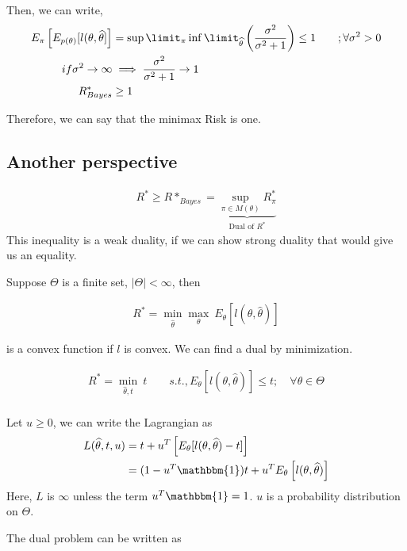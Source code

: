 \documentclass[10pt]{article}
\renewcommand{\hat}{\widehat}
\begin{document}
	Then, we can write,
	\begin{align*}
		E_{\pi}\left[ E_{p(\theta)} [l(\theta,\hat{\theta}]\right] &= \sup\limit_{\pi}\inf\limit_{\hat{\theta}}\left( \frac{\sigma^2}{\sigma^2+1} \right) \leq 1  \qquad ;\forall \sigma^2 > 0\\
		if \sigma^2 \rightarrow \infty &\implies \frac{\sigma^2}{\sigma^2 + 1} \rightarrow 1\\
		R^*_{Bayes} &\geq 1\\
	\end{align*}
	
	Therefore, we can say that the minimax Risk is one.
	
	\subsection*{Another perspective}
	\begin{align*}
		R^* \geq R*_{Bayes} = \underbrace{\sup\limits_{\pi \in M(\theta)} R^*_{\pi}}_\text{Dual of $R^*$}
	\end{align*}
	This inequality is a weak duality, if we can show strong duality that would give us an equality.
	
	Suppose $\Theta$ is a finite set, $\lvert \Theta \rvert < \infty$, then
	
	\begin{align*}
		R^* = \min\limits_{\hat{\theta}} \max\limits_{\theta}\ E_{\theta}\left[ l(\theta,\hat\theta)\right]
	\end{align*}
	
	is a convex function if $l$ is convex. We can find a dual by minimization.
	
	\begin{align*}
		R^* = \min\limits_{\hat{\theta},t}\ t \qquad s.t., E_{\theta}\left[ l(\theta,\hat\theta)\right] \leq t; \quad \forall \theta \in \Theta\\
	\end{align*}
	
	Let $u\geq0$, we can write the Lagrangian as 
	\begin{align*}
		L(\hat\theta,t,u) &= t + u^T\left[ E_\theta[l(\theta,\hat\theta)-t]\right]\\
		&= (1-u^T \mathbbm{1})t + u^T E_\theta\left[ l(\theta,\hat\theta)\right]\\
	\end{align*}
	Here, $L$ is $\infty$ unless the term $u^T \mathbbm{1}=1$. $u$ is a probability distribution on $\Theta$.
	
	The dual problem can be written as 
	
\end{document}

